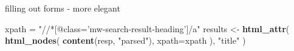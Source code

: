 \documentclass[ignorenonframetext,]{beamer}
\newenvironment{Shaded}{\begin{snugshade}}{\end{snugshade}}
\newcommand{\KeywordTok}[1]{\textcolor[rgb]{0.13,0.29,0.53}{\textbf{{#1}}}}
\newcommand{\DataTypeTok}[1]{\textcolor[rgb]{0.13,0.29,0.53}{{#1}}}
\newcommand{\StringTok}[1]{\textcolor[rgb]{0.31,0.60,0.02}{{#1}}}
\newcommand{\NormalTok}[1]{{#1}}
\begin{document}
\begin{frame}[fragile]{filling out forms - more elegant}

\begin{Shaded}
\begin{Highlighting}[]
\NormalTok{xpath =}\StringTok{ "//*[@class='mw-search-result-heading']/a"}
\NormalTok{results <-}\StringTok{ }
\KeywordTok{html_attr}\NormalTok{(}
  \KeywordTok{html_nodes}\NormalTok{(}
    \KeywordTok{content}\NormalTok{(resp, }\StringTok{"parsed"}\NormalTok{), }
    \DataTypeTok{xpath=}\NormalTok{xpath}
  \NormalTok{), }\StringTok{"title"} \NormalTok{)}
\end{Highlighting}
\end{Shaded}

\end{frame}
\end{document}
